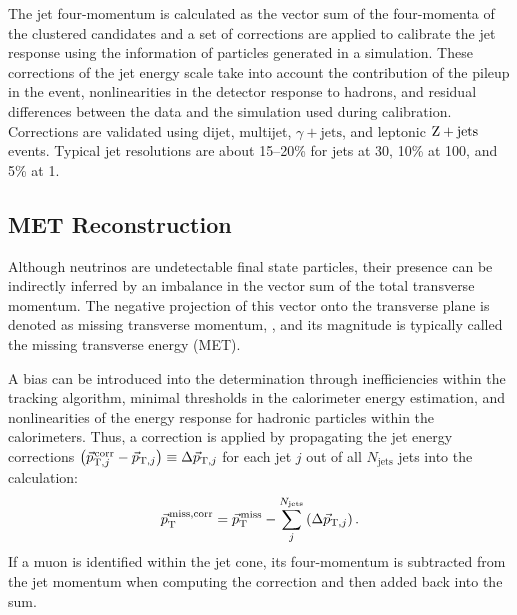 The jet four-momentum is calculated as the vector sum of the four-momenta of the clustered candidates and a set of corrections are applied to calibrate the jet response using the information of particles generated in a simulation.
These corrections of the jet energy scale take into account the contribution of the pileup in the event, nonlinearities in the detector response to hadrons, and residual differences between the data and the simulation used during calibration.
Corrections are validated using dijet, multijet, $\gamma + \text{jets}$, and leptonic $\text{Z} + \text{jets}$ events. %
Typical jet resolutions are about 15--20\% for jets at 30\GeV, 10\% at 100\GeV, and 5\% at 1\TeV.


\subsection{MET Reconstruction}
\label{sec:met_reco}
Although neutrinos are undetectable final state particles, their presence can be indirectly inferred by an imbalance in the vector sum of the total transverse momentum.
The negative projection of this vector onto the transverse plane is denoted as missing transverse momentum, \ptvecmiss, and its magnitude is typically called the missing transverse energy (MET).

A bias can be introduced into the \ptvecmiss determination through inefficiencies within the tracking algorithm, minimal thresholds in the calorimeter energy estimation, and nonlinearities of the energy response for hadronic particles within the calorimeters.
Thus, a correction is applied by propagating the jet energy corrections $\left( \vec{p}_{\text{T}, j}^{\kern1pt \text{corr}} - \vec{p}_{\text{T}, j} \right) \equiv \Delta \vec{p}_{\text{T}, j}$ for each jet $j$ out of all $N_\text{jets}$ jets into the calculation:
\begin{equation}
{\vec p}_{\mathrm{T}}^{\kern1pt \text{miss,corr}} =
    {\vec p}_{\mathrm{T}}^{\kern1pt\text{miss}} - \sum^{N_\text{jets}}_{j}
        \left( \Delta \vec{p}_{\text{T}, j} \right).
\end{equation}
If a muon is identified within the jet cone, its four-momentum is subtracted from the jet momentum when computing the correction and then added back into the \ptvecmiss sum.